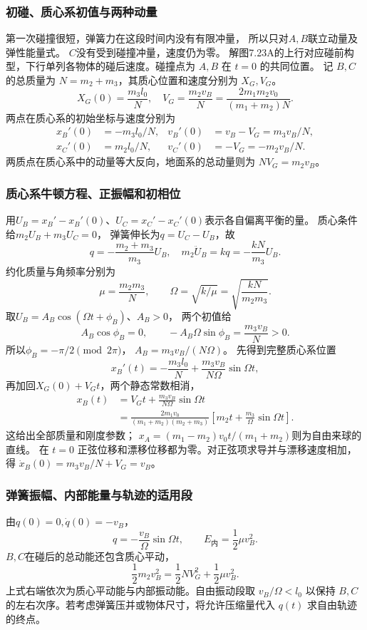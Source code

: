 \documentclass[UTF8,fontset=fandol,a4paper,11pt]{ctexart}
\begin{document}
\subsubsection*{初碰、质心系初值与两种动量}
第一次碰撞很短，弹簧力在这段时间内没有有限冲量，
所以只对$A,B$联立动量及弹性能量式。
$C$没有受到碰撞冲量，速度仍为零。
解图7.23A的上行对应碰前构型，下行单列各物体的碰后速度。碰撞点为 $A,B$ 在 $t=0$ 的共同位置。
记 $B,C$ 的总质量为 $N=m_2+m_3$，其质心位置和速度分别为 $X_G,V_G$。
\[
X_G(0)=\frac{m_3l_0}{N},\quad
V_G=\frac{m_2v_B}{N}
=\frac{2m_1m_2v_0}{(m_1+m_2)N}.
\]
两点在质心系的初始坐标与速度分别为
\[
\begin{aligned}
x_B'(0)&=-m_3l_0/N,&v_B'(0)&=v_B-V_G=m_3v_B/N,\\
x_C'(0)&=m_2l_0/N,&v_C'(0)&=-V_G=-m_2v_B/N.
\end{aligned}
\]
两质点在质心系中的动量等大反向，地面系的总动量则为 $NV_G=m_2v_B$。

\subsubsection*{质心系牛顿方程、正振幅和初相位}
用$U_B=x_B'-x_B'(0)$、$U_C=x_C'-x_C'(0)$表示各自偏离平衡的量。
质心条件给$m_2U_B+m_3U_C=0$，
弹簧伸长为$q=U_C-U_B$，故
\[
q=-\frac{m_2+m_3}{m_3}U_B,
\quad m_2\ddot U_B=kq=-\frac{kN}{m_3}U_B.
\]
约化质量与角频率分别为
\[
\mu=\frac{m_2m_3}{N},\qquad
\Omega=\sqrt{k/\mu}=\sqrt{\frac{kN}{m_2m_3}}.
\]
取$U_B=A_B\cos(\Omega t+\phi_B)$、$A_B>0$，
两个初值给
\[
A_B\cos\phi_B=0,\qquad
-A_B\Omega\sin\phi_B=\frac{m_3v_B}{N}>0.
\]
所以$\phi_B=-\pi/2\pmod{2\pi}$，
$A_B=m_3v_B/(N\Omega)$。
先得到完整质心系位置
\[
x_B'(t)=-\frac{m_3l_0}{N}
+\frac{m_3v_B}{N\Omega}\sin\Omega t,
\]
再加回$X_G(0)+V_Gt$，两个静态常数相消，
\[
\begin{aligned}
x_B(t)&=V_Gt+\frac{m_3v_B}{N\Omega}\sin\Omega t\\
&=\frac{2m_1v_0}{(m_1+m_2)(m_2+m_3)}
\left[m_2t+\frac{m_3}{\Omega}\sin\Omega t\right].
\end{aligned}
\]
这给出全部质量和刚度参数；
$x_A=(m_1-m_2)v_0t/(m_1+m_2)$则为自由来球的直线。
在 $t=0$ 正弦位移和漂移位移都为零。对正弦项求导并与漂移速度相加，得 $\dot x_B(0)=m_3v_B/N+V_G=v_B$。

\subsubsection*{弹簧振幅、内部能量与轨迹的适用段}
由$q(0)=0,\dot q(0)=-v_B$，
\[
q=-\frac{v_B}{\Omega}\sin\Omega t,
\qquad E_{\text{内}}=\frac12\mu v_B^2.
\]
$B,C$在碰后的总动能还包含质心平动，
\[
\frac12m_2v_B^2=\frac12NV_G^2+\frac12\mu v_B^2.
\]
上式右端依次为质心平动能与内部振动能。自由振动段取 $v_B/\Omega<l_0$ 以保持 $B,C$ 的左右次序。若考虑弹簧压并或物体尺寸，将允许压缩量代入 $q(t)$ 求自由轨迹的终点。
\end{document}
